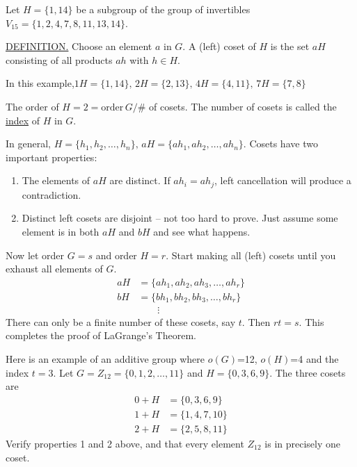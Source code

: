 \documentclass[12pt]{book}
\theoremstyle{definition}
\begin{document}
Let $H=\{1,14\}$ be a subgroup of the group of invertibles $V_{15}=\{1,2,4,7,8,11,13,14\}$.

\underline{DEFINITION.} Choose an element $a$ in $G$.  A (left) coset of $H$ is the set $aH$ consisting of all products $ah$ with $h\in H$.

In this example,$1H=\{1,14\},\,2H=\{2,13\},\,4H=\{4,11\},\,7H=\{7,8\}$

The order of $H=2=\text{order} \, G/$\# of cosets.  The number of cosets is called the \underline{index} of $H$ in $G$.

In general, $H=\{h_1, h_2, \dots, h_n\},\,aH=\{ah_1, ah_2,\dots,ah_n\}$.  Cosets have two important properties:
\begin{enumerate}
\item The elements of $aH$ are distinct.  If $ah_i=ah_j$, left cancellation will produce a contradiction.
\item Distinct left cosets are disjoint -- not too hard to prove.  Just assume some element is in both $aH$ and $bH$ and see what happens.
\end{enumerate}
Now let order $G=s$ and order $H=r$.  Start making all (left) cosets until you exhaust all elements of $G$.
\begin{equation*}\begin{split}
aH&=\{ah_1,ah_2,ah_3,\dots,ah_r\}\\
bH&=\{bh_1,bh_2,bh_3,\dots,bh_r\}\\
&\qquad\vdots
\end{split}\end{equation*}
There can only be a finite number of these cosets, say $t$.  Then $rt=s$.  This completes the proof of LaGrange's Theorem.

Here is an example of an additive group where $o(G)$=12, $o(H)$=4 and the index $t=3$.  Let $G=Z_{12}=\{0,1,2,\dots,11\}$ and $H=\{0,3,6,9\}$.  The three cosets are
\begin{equation*}\begin{split}
0+H &= \{0,3,6,9\}\\
1+H&=\{1,4,7,10\}\\
2+H&=\{2,5,8,11\}
\end{split}\end{equation*}
Verify properties 1 and 2 above, and that every element $Z_{12}$ is in precisely one coset.
\end{document}
